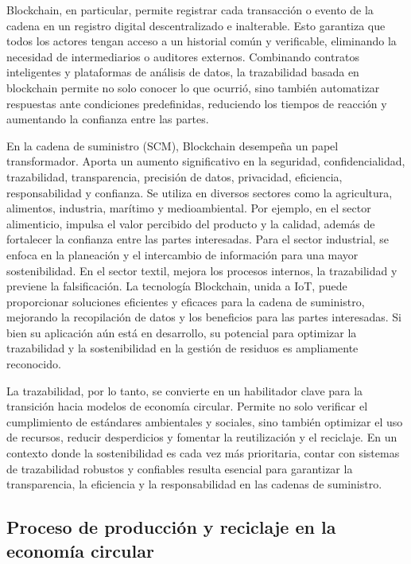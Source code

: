 Blockchain, en particular, permite registrar cada transacción o evento de la cadena en un registro digital descentralizado e inalterable. Esto garantiza que todos los actores tengan acceso a un historial común y verificable, eliminando la necesidad de intermediarios o auditores externos. Combinando contratos inteligentes y plataformas de análisis de datos, la trazabilidad basada en blockchain permite no solo conocer lo que ocurrió, sino también automatizar respuestas ante condiciones predefinidas, reduciendo los tiempos de reacción y aumentando la confianza entre las partes.

En la cadena de suministro (SCM), Blockchain desempeña un papel transformador. Aporta un aumento significativo en la seguridad, confidencialidad, trazabilidad, transparencia, precisión de datos, privacidad, eficiencia, responsabilidad y confianza. Se utiliza en diversos sectores como la agricultura, alimentos, industria, marítimo y medioambiental. Por ejemplo, en el sector alimenticio, impulsa el valor percibido del producto y la calidad, además de fortalecer la confianza entre las partes interesadas. Para el sector industrial, se enfoca en la planeación y el intercambio de información para una mayor sostenibilidad. En el sector textil, mejora los procesos internos, la trazabilidad y previene la falsificación. La tecnología Blockchain, unida a IoT, puede proporcionar soluciones eficientes y eficaces para la cadena de suministro, mejorando la recopilación de datos y los beneficios para las partes interesadas. Si bien su aplicación aún está en desarrollo, su potencial para optimizar la trazabilidad y la sostenibilidad en la gestión de residuos es ampliamente reconocido.

La trazabilidad, por lo tanto, se convierte en un habilitador clave para la transición hacia modelos de economía circular. Permite no solo verificar el cumplimiento de estándares ambientales y sociales, sino también optimizar el uso de recursos, reducir desperdicios y fomentar la reutilización y el reciclaje. En un contexto donde la sostenibilidad es cada vez más prioritaria, contar con sistemas de trazabilidad robustos y confiables resulta esencial para garantizar la transparencia, la eficiencia y la responsabilidad en las cadenas de suministro.

\subsection{Proceso de producción y reciclaje en la economía circular}

